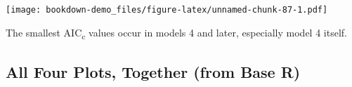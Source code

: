 \documentclass[]{book}
\newenvironment{Shaded}{\begin{snugshade}}{\end{snugshade}}
\newcommand{\KeywordTok}[1]{\textcolor[rgb]{0.13,0.29,0.53}{\textbf{#1}}}
\newcommand{\DataTypeTok}[1]{\textcolor[rgb]{0.13,0.29,0.53}{#1}}
\newcommand{\DecValTok}[1]{\textcolor[rgb]{0.00,0.00,0.81}{#1}}
\newcommand{\FloatTok}[1]{\textcolor[rgb]{0.00,0.00,0.81}{#1}}
\newcommand{\StringTok}[1]{\textcolor[rgb]{0.31,0.60,0.02}{#1}}
\newcommand{\OperatorTok}[1]{\textcolor[rgb]{0.81,0.36,0.00}{\textbf{#1}}}
\newcommand{\NormalTok}[1]{#1}
\theoremstyle{definition}
\theoremstyle{definition}
\theoremstyle{definition}
\theoremstyle{remark}
\begin{document}
\begin{Shaded}
\end{Shaded}

\texttt{[image: bookdown-demo\_files/figure-latex/unnamed-chunk-87-1.pdf]}

The smallest AIC\textsubscript{c} values occur in models 4 and later,
especially model 4 itself.

\subsection{All Four Plots, Together (from Base
R)}\label{all-four-plots-together-from-base-r}
\end{document}
